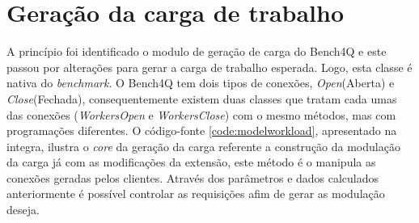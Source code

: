 \section{Geração da carga de trabalho}
A princípio foi identificado o modulo de geração de carga do Bench4Q e este passou por alterações para gerar a carga de trabalho esperada. Logo, esta classe é nativa do \textit{benchmark}. O Bench4Q tem dois tipos de conexões, \textit{Open}(Aberta) e \textit{Close}(Fechada), consequentemente existem duas classes que tratam cada umas das conexões (\textit{WorkersOpen} e \textit{WorkersClose}) com o mesmo métodos, mas com programações diferentes.
O código-fonte \ref{code:modelworkload}, apresentado na integra, ilustra o \textit{core} da geração da carga referente a construção da modulação da carga já com as modificações da extensão, este método é o manipula as conexões geradas pelos clientes. Através dos parâmetros e dados calculados anteriormente é possível controlar as requisições afim de gerar as modulação deseja.

